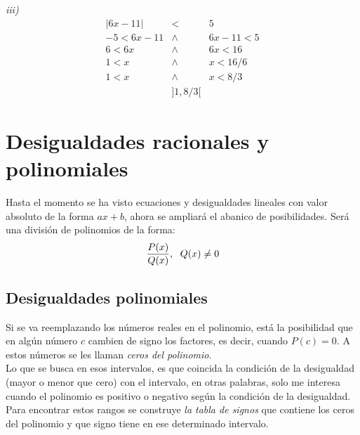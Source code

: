 \textit{iii)}\\
\begin{eqnarray*}
|6x-11| &<& 5 \\
-5< 6x-11 &\wedge& 6x-11<5\\
6< 6x &\wedge & 6x<16\\
1< x &\wedge & x<16/6\\
1< x &\wedge & x<8/3\\
& ]1,8/3[ &
\end{eqnarray*}

\section{Desigualdades racionales y polinomiales}
Hasta el momento se ha visto ecuaciones y desigualdades lineales con valor absoluto de la forma $ax+b$, ahora se ampliará el abanico de posibilidades. Será una división de polinomios de la forma:
\begin{eqnarray*}
\dfrac{P(x)}{Q(x)}, \hspace{6px} Q(x)\neq 0
\end{eqnarray*}

\subsection{Desigualdades polinomiales}

Si se va reemplazando los números reales en el polinomio, está la posibilidad que en algún número $c$ cambien de signo los factores, es decir, cuando $P(c)=0$. A estos números se les llaman \textit{ceros del polinomio}.\\
Lo que se busca en esos intervalos, es que coincida la condición de la desigualdad (mayor o menor que cero) con el intervalo, en otras palabras, solo me interesa cuando el polinomio es positivo o negativo según la condición de la desigualdad. Para encontrar estos rangos se construye \textit{la tabla de signos} que contiene los ceros del polinomio y que signo tiene en ese determinado intervalo.\\

